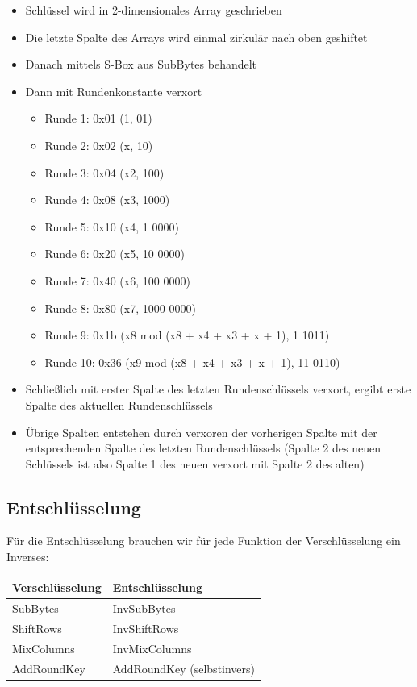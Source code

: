 \begin{itemize}
    \item Schlüssel wird in 2-dimensionales Array geschrieben
    \item Die letzte Spalte des Arrays wird einmal zirkulär nach oben geshiftet
    \item Danach mittels S-Box aus SubBytes behandelt
    \item Dann mit Rundenkonstante verxort
    \begin{itemize}
        \item Runde 1: 0x01 (1, 01)
        \item Runde 2: 0x02 (x, 10)
        \item Runde 3: 0x04 (x2, 100)
        \item Runde 4: 0x08 (x3, 1000)
        \item Runde 5: 0x10 (x4, 1 0000)
        \item Runde 6: 0x20 (x5, 10 0000)
        \item Runde 7: 0x40 (x6, 100 0000)
        \item Runde 8: 0x80 (x7, 1000 0000)
        \item Runde 9: 0x1b (x8 mod (x8 + x4 + x3 + x + 1), 1 1011)
        \item Runde 10: 0x36 (x9 mod (x8 + x4 + x3 + x + 1), 11 0110)
    \end{itemize}
    \item Schließlich mit erster Spalte des letzten Rundenschlüssels verxort, ergibt erste Spalte des aktuellen Rundenschlüssels
    \item Übrige Spalten entstehen durch verxoren der vorherigen Spalte mit der entsprechenden Spalte des letzten Rundenschlüssels
(Spalte 2 des neuen Schlüssels ist also Spalte 1 des neuen verxort mit Spalte 2 des alten) 
\end{itemize}

\subsection{Entschlüsselung}

Für die Entschlüsselung brauchen wir für jede Funktion der Verschlüsselung ein Inverses:

\begin{center}
    \begin{tabular}{ ll } 
        \hline
        Verschlüsselung & Entschlüsselung \\ 
        \hline
        SubBytes & InvSubBytes \\
        ShiftRows & InvShiftRows \\
        MixColumns & InvMixColumns \\
        AddRoundKey & AddRoundKey (selbstinvers) \\
        \hline
    \end{tabular}
\end{center}

